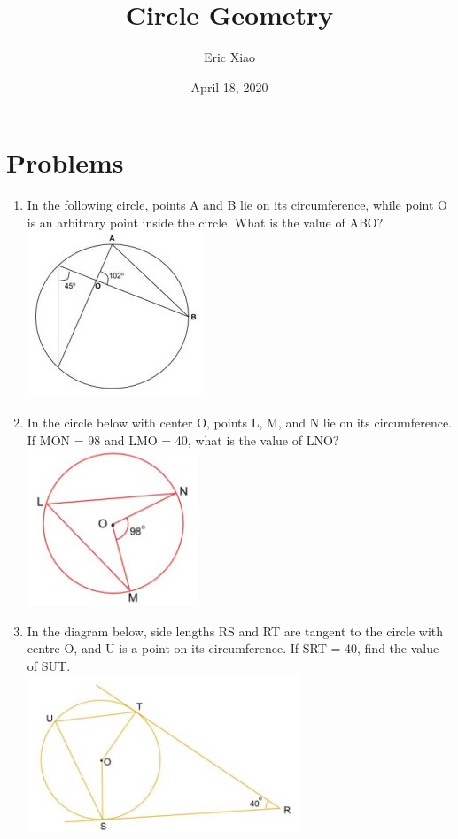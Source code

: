 \documentclass[12pt]{extarticle}
\title{Circle Geometry}
\author{Eric Xiao}
\date{April 18, 2020}
\begin{document}
\maketitle

\section{Problems}
\begin{enumerate}
    \item {In the following circle, points A and B lie on its circumference, while point O is an arbitrary point inside the circle. What is the value of \angle ABO?\\
    \includegraphics{April_18_Q1}}
    \item {In the circle below with center O, points L, M, and N lie on its circumference. If \angle MON = {98\textdegree} and \angle LMO = {40\textdegree}, what is the value of \angle LNO?\\
    \includegraphics{April_18_Q2}}
    \item {In the diagram below, side lengths RS and RT are tangent to the circle with centre O, and U is a point on its circumference. If \angle SRT = {40\textdegree}, find the value of \angle SUT.\\
    \includegraphics{April_18_Q3}}

\end{enumerate}
\end{document}
